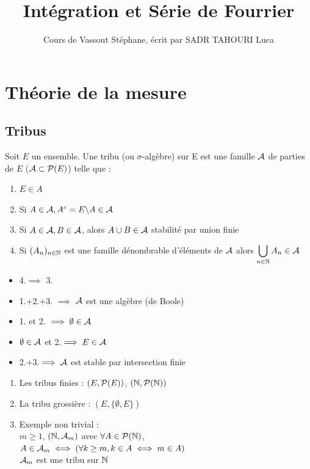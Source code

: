 \documentclass[]{report}
\title{Intégration et Série de Fourrier}
\author{Cours de Vassout Stéphane, écrit par SADR TAHOURI Luca}
\date{}
\begin{document}
    \maketitle
    \tableofcontents

\chapter{Théorie de la mesure}

\section{Tribus}

\begin{df}
    Soit $E$ un ensemble. Une tribu (ou $\sigma$-algèbre) sur E est une famille $\mathcal{A}$ de parties de $E$ ($\mathcal{A}\subset \mathcal{P}(E)$) telle que : \begin{enumerate}
        \item $E\in A$
        \item Si $A\in \mathcal{A},A^c=E\backslash A\in \mathcal{A}$
        \item Si $A\in \mathcal{A},B\in \mathcal{A}$, alors $A\cup B\in \mathcal{A}$ stabilité par union finie
        \item Si $(A_n)_{n\in\mathbb{N}}$ est une famille dénombrable d'éléments de $\mathcal{A}$ alors $\displaystyle{\bigcup_{n\in\mathbb{N}}A_n \in \mathcal{A}}$
    \end{enumerate}
\end{df}

\begin{re}
    \begin{itemize}
        \item 4.$\implies$ 3.
        \item 1.+2.+3. $\implies$ $\mathcal{A}$ est une algèbre (de Boole)
        \item 1. et 2. $\implies \emptyset\in\mathcal{A}$
        \item $\emptyset\in\mathcal{A}$ et 2.$\implies E\in \mathcal{A}$
        \item 2.+3.$\implies \mathcal{A}$ est stable par intersection finie
    \end{itemize}
\end{re}

\begin{ex}
\begin{enumerate}
    \item Les tribus finies : $(E,\mathcal{P}(E))$, $(\mathbb{N},\mathcal{P}(\mathbb{N}))$
    \item La tribu grossière : $(E,\{\emptyset,E\})$
    \item Exemple non trivial : \\
    $m\ge1$, $(\mathbb{N},\mathcal{A}_m)$ avec $\forall A\in \mathcal{P}(\mathbb{N})$, $A\in\mathcal{A}_m \iff(\forall k\ge m,k\in A\iff m\in A)$\\
    $\mathcal{A}_m$ est une tribu sur $\mathbb{N}$
\end{enumerate} 
\end{ex}
\end{document}
